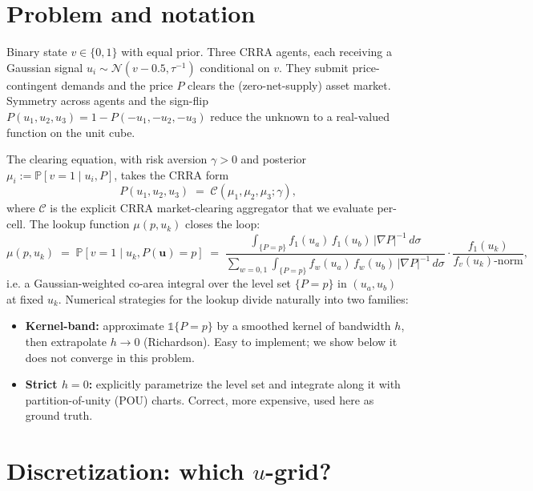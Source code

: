 \documentclass[11pt]{article}
\begin{document}
\section{Problem and notation}

Binary state $v \in \{0,1\}$ with equal prior. Three CRRA agents, each
receiving a Gaussian signal $u_i \sim \mathcal{N}(v - 0.5, \tau^{-1})$
conditional on $v$. They submit price-contingent demands and the price
$P$ clears the (zero-net-supply) asset market. Symmetry across agents
and the sign-flip $P(u_1, u_2, u_3) = 1 - P(-u_1, -u_2, -u_3)$ reduce
the unknown to a real-valued function on the unit cube.

The clearing equation, with risk aversion $\gamma > 0$ and
posterior $\mu_i := \mathbb{P}[v=1 \mid u_i, P]$, takes the CRRA form
\[
  P(u_1, u_2, u_3) \;=\; \mathcal{C}(\mu_1, \mu_2, \mu_3; \gamma),
\]
where $\mathcal{C}$ is the explicit CRRA market-clearing aggregator
that we evaluate per-cell. The lookup function $\mu(p, u_k)$ closes the
loop:
\[
  \mu(p, u_k) \;=\; \mathbb{P}[v = 1 \mid u_k, P(\mathbf{u}) = p]
   \;=\; \frac{\int_{\{P=p\}} f_1(u_a)\, f_1(u_b)\, |\nabla P|^{-1}\, d\sigma}
          {\sum_{w=0,1}\int_{\{P=p\}} f_w(u_a)\, f_w(u_b)\, |\nabla P|^{-1}\, d\sigma}
   \cdot \frac{f_1(u_k)}{f_v(u_k)\text{-norm}},
\]
i.e. a Gaussian-weighted co-area integral over the level set
$\{P = p\}$ in $(u_a, u_b)$ at fixed $u_k$. Numerical strategies for
the lookup divide naturally into two families:

\begin{itemize}\itemsep1pt
  \item \textbf{Kernel-band:} approximate $\mathbb{1}\{P = p\}$ by a
        smoothed kernel of bandwidth $h$, then extrapolate $h \to 0$
        (Richardson). Easy to implement; we show below it does not
        converge in this problem.
  \item \textbf{Strict $h = 0$:} explicitly parametrize the level set
        and integrate along it with partition-of-unity (POU) charts.
        Correct, more expensive, used here as ground truth.
\end{itemize}

\section{Discretization: which $u$-grid?}
\end{document}
